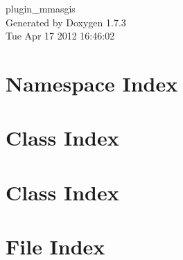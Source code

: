 \documentclass[a4paper]{book}
\begin{document}
\hypersetup{pageanchor=false}
\begin{titlepage}
\vspace*{7cm}
\begin{center}
{\Large plugin\_\-mmasgis }\\
\vspace*{1cm}
{\large Generated by Doxygen 1.7.3}\\
\vspace*{0.5cm}
{\small Tue Apr 17 2012 16:46:02}\\
\end{center}
\end{titlepage}
\clearemptydoublepage
{}
\tableofcontents
\clearemptydoublepage
{}
\hypersetup{pageanchor=true}
\chapter{Namespace Index}

\chapter{Class Index}

\chapter{Class Index}

\chapter{File Index}

\end{document}

